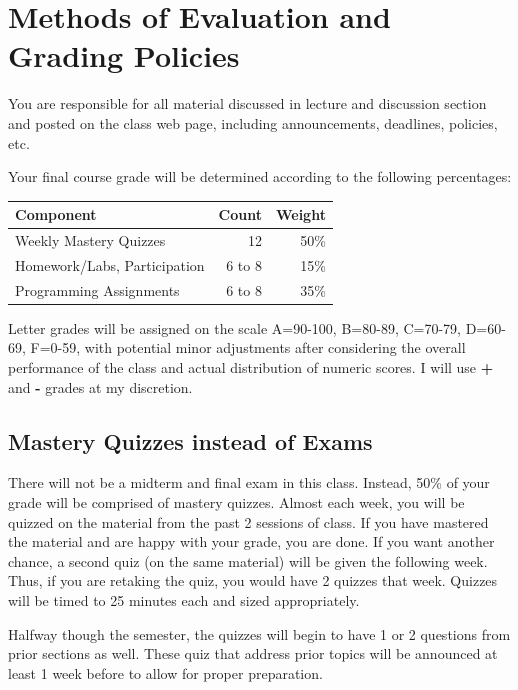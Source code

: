 \documentclass[11pt]{article}
\begin{document}
\section{Methods of Evaluation and Grading Policies}

You are responsible for all material discussed in lecture and discussion section and posted on the 
class web page, including announcements, deadlines, policies, etc. 

Your final course grade will be determined according to the following percentages: 
\begin{center}
\begin{tabular}{l|r|r}
\hline \hline
Component  &  Count & Weight\\
\hline
Weekly Mastery Quizzes             &  12                                    & 50\% \\ \hline
Homework/Labs, Participation     &  6 to 8                              & 15\% \\ \hline
Programming Assignments          &  6 to 8                             & 35\%\\ \hline
\hline
\end{tabular}
\end{center}

Letter grades will be assigned on the scale A=90-100, B=80-89, C=70-79, D=60-69, F=0-59, 
with potential minor adjustments after considering the overall performance of the class and 
actual distribution of numeric scores. I will use {\bf +} and {\bf- } grades at my discretion.  

\subsection{Mastery Quizzes instead of Exams}
There will {\bf}not be a midterm and final exam in this class.  Instead, 50\% of your
grade will be comprised of mastery quizzes.
Almost each week, you will be quizzed on the material from the past 2 sessions of class.
If you have mastered the material and are happy with your grade, you are done.
If you want another chance, a second quiz (on the same material) will be given the following week.
Thus, if you are retaking the quiz, you would have 2 quizzes that week.  
Quizzes will be timed to 25 minutes each and sized appropriately.

Halfway though the semester, the quizzes will begin to have 1 or 2 questions
from prior sections as well.  These quiz that address prior topics will be announced at least 1 week
before to allow for proper preparation.  
\end{document}
